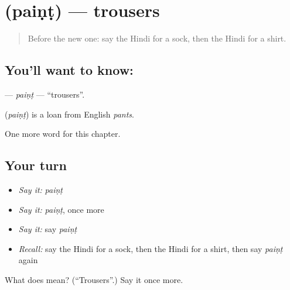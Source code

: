 \section[\texorpdfstring{\hi{पैंट} (paiṇṭ)}{पैंट (paiṇṭ)}]{ (paiṇṭ) — trousers}

\label{lesson:HI-C135-paint}



\begin{quote}
Before the new one: say the Hindi for a sock, then the Hindi for a shirt.
\end{quote}

\subsection*{You'll want to know: }
\textbf{} — \emph{paiṇṭ} — \textquotedblleft{}trousers\textquotedblright{}.

\begin{cousinweb}
\textbf{} (\emph{paiṇṭ}) is a loan from English \emph{pants}.
\end{cousinweb}

\begin{grammarlens}[title={What you've built}]
One more word for this chapter.
\end{grammarlens}

\subsection*{Your turn}
\begin{itemize}
\raggedright
  \item \emph{Say it:} \emph{paiṇṭ}
  \item \emph{Say it:} \emph{paiṇṭ}, once more
  \item \emph{Say it:} say \emph{paiṇṭ}
  \item \emph{Recall:} say the Hindi for a sock, then the Hindi for a shirt, then say \emph{paiṇṭ} again
\end{itemize}

\begin{tcolorbox}[breakable,colback=teal!4,colframe=teal!35!black,title={Before you move on}]
What does  mean? (\textquotedblleft{}Trousers\textquotedblright{}.) Say it once more.
\end{tcolorbox}
